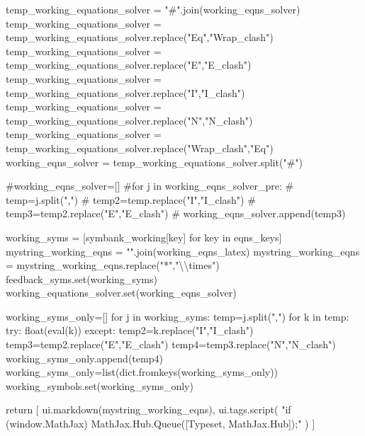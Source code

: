 \documentclass[
  letterpaper,
  DIV=11,
  numbers=noendperiod]{scrreprt}
\newenvironment{Shaded}{\begin{snugshade}}{\end{snugshade}}
\newcommand{\NormalTok}[1]{\textcolor[rgb]{0.00,0.23,0.31}{#1}}
\begin{document}
\begin{Shaded}
\begin{Highlighting}[]
\NormalTok{        temp\_working\_equations\_solver = "\#".join(working\_eqns\_solver)}
\NormalTok{        temp\_working\_equations\_solver = temp\_working\_equations\_solver.replace("Eq","Wrap\_clash")}
\NormalTok{        temp\_working\_equations\_solver = temp\_working\_equations\_solver.replace("E","E\_clash")}
\NormalTok{        temp\_working\_equations\_solver = temp\_working\_equations\_solver.replace("I","I\_clash")}
\NormalTok{        temp\_working\_equations\_solver = temp\_working\_equations\_solver.replace("N","N\_clash")}
\NormalTok{        temp\_working\_equations\_solver = temp\_working\_equations\_solver.replace("Wrap\_clash","Eq")}
\NormalTok{        working\_eqns\_solver = temp\_working\_equations\_solver.split("\#")}
        
\NormalTok{        \#working\_eqns\_solver=[]}
\NormalTok{        \#for j in working\_eqns\_solver\_pre:}
\NormalTok{        \#    temp=j.split(",")}
\NormalTok{        \#    temp2=temp.replace("I","I\_clash")}
\NormalTok{        \#    temp3=temp2.replace("E","E\_clash")}
\NormalTok{        \#    working\_eqns\_solver.append(temp3)}
        
\NormalTok{        working\_syms = [symbank\_working[key] for key in eqns\_keys]}
\NormalTok{        mystring\_working\_eqns = "".join(working\_eqns\_latex)}
\NormalTok{        mystring\_working\_eqns = mystring\_working\_eqns.replace("*","\textbackslash{}\textbackslash{}times")}
\NormalTok{        feedback\_syms.set(working\_syms)}
\NormalTok{        working\_equations\_solver.set(working\_eqns\_solver)}

\NormalTok{        working\_syms\_only=[]}
\NormalTok{        for j in working\_syms:}
\NormalTok{            temp=j.split(",")}
\NormalTok{            for k in temp:}
\NormalTok{                try: }
\NormalTok{                    float(eval(k))  }
\NormalTok{                except:}
\NormalTok{                    temp2=k.replace("I","I\_clash")}
\NormalTok{                    temp3=temp2.replace("E","E\_clash")}
\NormalTok{                    temp4=temp3.replace("N","N\_clash")}
\NormalTok{                    working\_syms\_only.append(temp4)}
\NormalTok{        working\_syms\_only=list(dict.fromkeys(working\_syms\_only))}
\NormalTok{        working\_symbols.set(working\_syms\_only)}
        
\NormalTok{        return [}
\NormalTok{            ui.markdown(mystring\_working\_eqns),}
\NormalTok{            ui.tags.script(}
\NormalTok{                "if (window.MathJax) MathJax.Hub.Queue([\textquotesingle{}Typeset\textquotesingle{}, MathJax.Hub]);"}
\NormalTok{            )}
\NormalTok{        ]}
    

\end{Highlighting}
\end{Shaded}
\end{document}

